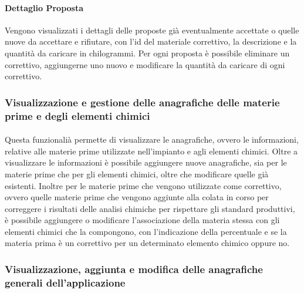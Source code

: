   \paragraph{Dettaglio Proposta}
  Vengono visualizzati i dettagli delle proposte già eventualmente accettate o quelle nuove da accettare 
  e rifiutare, con l’id del materiale correttivo, la descrizione e la quantità da caricare in chilogrammi. 
  Per ogni proposta è possibile eliminare un correttivo, aggiungerne uno nuovo e modificare la quantità 
  da caricare di ogni correttivo.


  \subsubsection{Visualizzazione e gestione delle anagrafiche delle materie prime e degli elementi chimici}
  \paragraph{}
  Questa funzionalià permette di visualizzare le anagrafiche, ovvero le informazioni, relative alle 
  materie prime utilizzate nell’impianto e agli elementi chimici. Oltre a visualizzare le informazioni è 
  possibile aggiungere nuove anagrafiche, sia per le materie prime che per gli elementi chimici, oltre 
  che modificare quelle già esistenti. Inoltre per le materie prime che vengono utilizzate come correttivo, 
  ovvero quelle materie prime che vengono aggiunte alla colata in corso per correggere i risultati delle 
  analisi chimiche per rispettare gli standard produttivi, è possibile aggiungere o modificare l’associazione della 
  materia stessa con gli elementi chimici che la compongono, con l’indicazione della percentuale e se la 
  materia prima è un correttivo per un determinato elemento chimico oppure no.
  
  \subsubsection{Visualizzazione, aggiunta e modifica  delle anagrafiche generali dell’applicazione}
